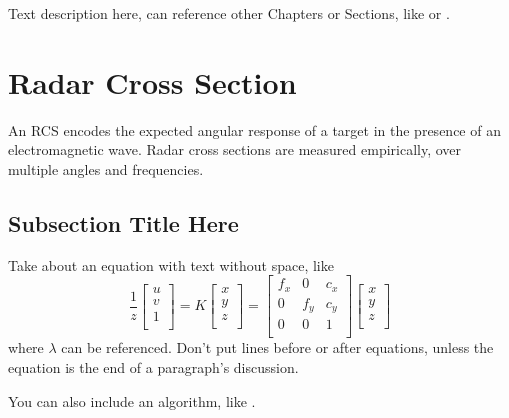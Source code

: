 	Text description here, can reference other Chapters or Sections, like  or .

\section{Radar Cross Section}
\label{sec:RCS}

An RCS encodes the expected angular response of a target in the presence of an electromagnetic wave. Radar cross sections are measured empirically, over multiple angles and frequencies.

\subsection[Optional TOC Subsection Title Here]{Subsection Title Here}
\label{sec:subsectionRefNameHere}

Take about an equation with text without space, like
\begin{equation}
\label{eq:eqRefNameHere}
\frac{1}{z}
\begin{bmatrix}
u \\
v \\
1 \\
\end{bmatrix}=
K \begin{bmatrix}
x \\
y \\
z \\
\end{bmatrix}=
\begin{bmatrix}
f_x & 0 & c_x \\
0 & f_y & c_y \\
0 & 0 & 1 \\
\end{bmatrix}
\begin{bmatrix}
x \\
y \\
z \\
\end{bmatrix}
\end{equation}
where $\lambda$ can be referenced. Don't put lines before or after equations, unless the equation is the end of a paragraph's discussion.

You can also include an algorithm, like .

